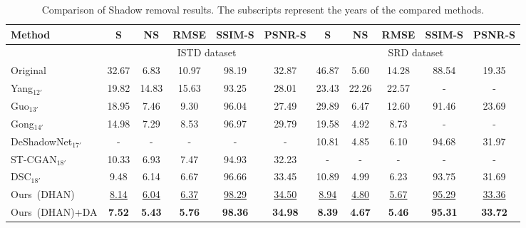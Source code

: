 \documentclass[letterpaper]{article} \usepackage{aaai20}  \usepackage{times}  \usepackage{helvet} \usepackage{courier}  \usepackage[hyphens]{url}  \urlstyle{rm} \def\UrlFont{\rm}  \usepackage{graphicx}  \frenchspacing  \setlength{\pdfpagewidth}{8.5in}  \setlength{\pdfpageheight}{11in}  \usepackage{amssymb}
\begin{document}
\begin{table*}[t]
\begin{center}
\caption{Comparison of Shadow removal results. The subscripts represent the years of the compared methods.}
\label{table:rmse}
\begin{tabular}{|l|c|c|c|c|c|c|c|c|c|c|}
\hline
Method & S & NS & RMSE  & SSIM-S  & PSNR-S & S & NS & RMSE  & SSIM-S  & PSNR-S  \\
\hline
& \multicolumn{5}{|c|}{ISTD dataset} & \multicolumn{5}{|c|}{SRD dataset} \\
\hline
Original  & 32.67 & 6.83 & 10.97 & 98.19 & 32.87 & 46.87 & 5.60 & 14.28 & 88.54 & 19.35 \\
Yang$_{12'}$  &  19.82      &  14.83     & 15.63   & 93.25 & 28.01  &  23.43      &  22.26     & 22.57  & -  &  - \\
Guo$_{13'}$  &  18.95      &   7.46     & 9.30   & 96.04 & 27.49 &  29.89     &   6.47     & 12.60   & 91.46 & 23.69   \\
Gong$_{14'}$  & 14.98 &  7.29 & 8.53  & 96.97 & 29.79 & 19.58 &  4.92 & 8.73  & - & - \\
DeShadowNet$_{17'}$  &  -   & - & - & - &  - &  10.81 & 4.85 & 6.10  & 94.68 & 31.97 \\
ST-CGAN$_{18'}$    &  10.33   & 6.93 & 7.47  & 94.93  &  32.23 & - & - & -&- & -\\
DSC$_{18'}$  &   9.48      &  6.14   & 6.67   &   96.66     &  33.45  & 10.89  & 4.99 &  6.23  & 93.75  & 31.69 \\
Ours~(DHAN)  &  \underline{8.14} & \underline{6.04} & \underline{6.37} & \underline{98.29} & \underline{34.50} &  \underline{8.94} & \underline{4.80} & \underline{5.67} & \underline{95.29} & \underline{33.36} \\
Ours~(DHAN)+DA    & \textbf{7.52}  & \textbf{5.43} & \textbf{5.76} & \textbf{98.36} & \textbf{34.98}  & \textbf{8.39} & \textbf{4.67} & \textbf{5.46} & \textbf{95.31}  & \textbf{33.72} \\
\hline
\end{tabular}
\end{center}
\end{table*}
\end{document}
